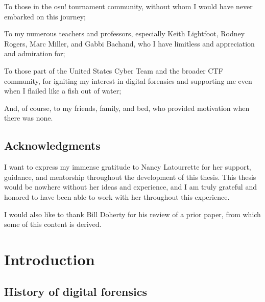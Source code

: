 \documentclass[letterpaper,12pt]{report}
\begin{document}
To those in the osu! tournament community, without whom I would have
never embarked on this journey;

To my numerous teachers and professors, especially Keith Lightfoot,
Rodney Rogers, Marc Miller, and Gabbi Bachand, who I have limitless and
appreciation and admiration for;

To those part of the United States Cyber Team and the broader CTF
community, for igniting my interest in digital forensics and supporting
me even when I flailed like a fish out of water;

And, of course, to my friends, family, and bed, who provided motivation
when there was none.


\newpage

\section*{Acknowledgments}

I want to express my immense gratitude to Nancy Latourrette for her
support, guidance, and mentorship throughout the development of this
thesis. This thesis would be nowhere without her ideas and experience,
and I am truly grateful and honored to have been able to work with her
throughout this experience.

I would also like to thank Bill Doherty for his review of a prior paper,
from which some of this content is derived.


\newpage
\renewcommand*\contentsname{Table of Contents}
\tableofcontents

\newpage
\listoftables

\newpage
\listoffigures

\newpage
{}
\setcounter{page}{1}
\linespread{2}

\chapter{Introduction}\label{chapter-one}

\section{History of digital
forensics}\label{history-of-digital-forensics}
\end{document}
